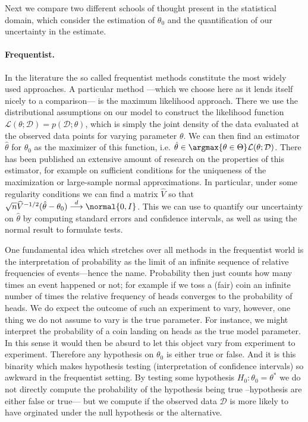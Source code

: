 Next we compare two different schools of thought present in the statistical domain, which consider the estimation of $\theta_0$ and the quantification of our uncertainty in the estimate.

\paragraph{Frequentist.}
In the literature the so called frequentist methods constitute the most widely used approaches.
A particular method ---which we choose here as it lends itself nicely to a comparison--- is the maximum likelihood approach.
There we use the distributional assumptions on our model to construct the likelihood function $\mathcal{L}(\theta; \mathcal{D}) = p(\mathcal{D}; \theta)$, which is simply the joint density of the data evaluated at the observed data points for varying parameter $\theta$.
We can then find an estimator $\hat{\theta}$ for $\theta_0$ as the maximizer of this function, i.e. $\hat{\theta} \in \argmax{\theta \in \Theta} \mathcal{L}(\theta; \mathcal{D})$.
There has been published an extensive amount of research on the properties of this estimator, for example on sufficient conditions for the uniqueness of the maximization or large-sample normal approximations.
In particular, under some regularity conditions we can find a matrix $\widehat{V}$ so that $\sqrt{n}\widehat{V}^{-1/2}(\hat{\theta} - \theta_0) \overset{d}{\longrightarrow} \normal{0, I}$.
This we can use to quantify our uncertainty on $\hat{\theta}$ by computing standard errors and confidence intervals, as well as using the normal result to formulate tests.

One fundamental idea which stretches over all methods in the frequentist world is the interpretation of probability as the limit of an infinite sequence of relative frequencies of events---hence the name.
Probability then just counts how many times an event happened or not; for example if we toss a (fair) coin an infinite number of times the relative frequency of heads converges to the probability of heads.
We do expect the outcome of such an experiment to vary, however, one thing we do not assume to vary is the true parameter.
For instance, we might interpret the probability of a coin landing on heads as the true model parameter.
In this sense it would then be absurd to let this object vary from experiment to experiment.
Therefore any hypothesis on $\theta_0$ is either true or false.
And it is this binarity which makes hypothesis testing (interpretation of confidence intervals) so awkward in the frequentist setting.
By testing some hypothesis $H_0: \theta_0 = \theta^*$ we do not directly compute the probability of the hypothesis being true --hypothesis are either false or true--- but we compute if the observed data $\mathcal{D}$ is more likely to have orginated under the null hypothesis or the alternative.

